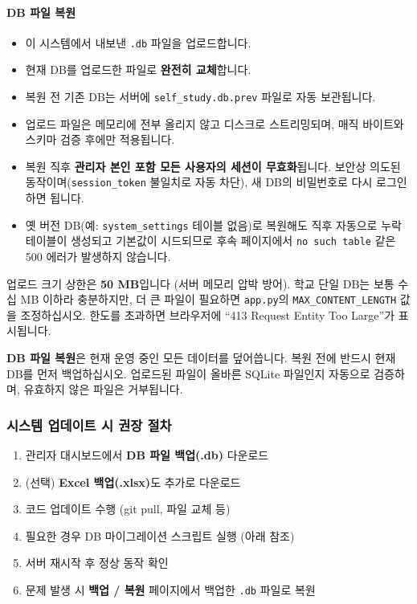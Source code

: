 \documentclass[a4paper,12pt]{article}
\newcommand{\menu}[1]{\textcolor{primary}{\textbf{#1}}}
\begin{document}
\paragraph{DB 파일 복원}
\begin{itemize}
  \item 이 시스템에서 내보낸 \texttt{.db} 파일을 업로드합니다.
  \item 현재 DB를 업로드한 파일로 \textbf{완전히 교체}합니다.
  \item 복원 전 기존 DB는 서버에 \texttt{self\_study.db.prev} 파일로 자동 보관됩니다.
  \item 업로드 파일은 메모리에 전부 올리지 않고 디스크로 스트리밍되며,
        매직 바이트와 스키마 검증 후에만 적용됩니다.
  \item 복원 직후 \textbf{관리자 본인 포함 모든 사용자의 세션이 무효화}됩니다.
        보안상 의도된 동작이며(\texttt{session\_token} 불일치로 자동 차단),
        새 DB의 비밀번호로 다시 로그인하면 됩니다.
  \item 옛 버전 DB(예: \texttt{system\_settings} 테이블 없음)로 복원해도
        직후 자동으로 누락 테이블이 생성되고 기본값이 시드되므로
        후속 페이지에서 \texttt{no such table} 같은 500 에러가 발생하지 않습니다.
\end{itemize}

\begin{notebox}
  업로드 크기 상한은 \textbf{50 MB}입니다 (서버 메모리 압박 방어).
  학교 단일 DB는 보통 수십 MB 이하라 충분하지만,
  더 큰 파일이 필요하면 \texttt{app.py}의 \texttt{MAX\_CONTENT\_LENGTH} 값을 조정하십시오.
  한도를 초과하면 브라우저에 ``413 Request Entity Too Large''가 표시됩니다.
\end{notebox}

\begin{warnbox}
  \textbf{DB 파일 복원}은 현재 운영 중인 모든 데이터를 덮어씁니다.
  복원 전에 반드시 현재 DB를 먼저 백업하십시오.
  업로드된 파일이 올바른 SQLite 파일인지 자동으로 검증하며,
  유효하지 않은 파일은 거부됩니다.
\end{warnbox}

\subsubsection*{시스템 업데이트 시 권장 절차}

\begin{enumerate}
  \item 관리자 대시보드에서 \textbf{DB 파일 백업(.db)} 다운로드
  \item (선택) \textbf{Excel 백업(.xlsx)}도 추가로 다운로드
  \item 코드 업데이트 수행 (git pull, 파일 교체 등)
  \item 필요한 경우 DB 마이그레이션 스크립트 실행 (아래 참조)
  \item 서버 재시작 후 정상 동작 확인
  \item 문제 발생 시 \menu{백업 / 복원} 페이지에서 백업한 \texttt{.db} 파일로 복원
\end{enumerate}
\end{document}
